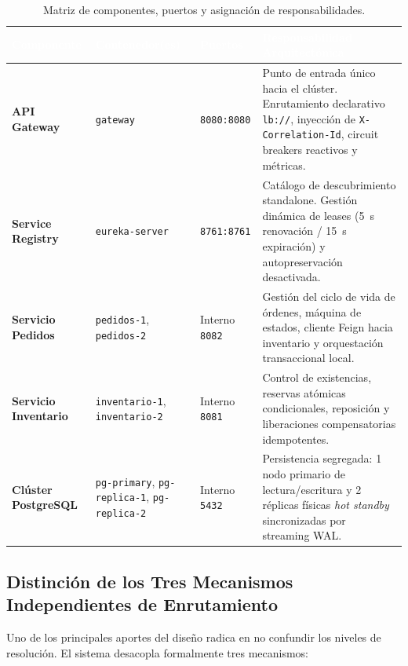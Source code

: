 \documentclass[12pt,a4paper]{article}
\begin{document}
\begin{table}[H]
\centering
\small
\begin{tabularx}{\textwidth}{@{}L{2.8cm}L{3.0cm}L{2.2cm}Y@{}}
\toprule[1.2pt]
\textcolor{white}{\textbf{Componente}} & 
\textcolor{white}{\textbf{Contenedor(es)}} & 
\textcolor{white}{\textbf{Puertos}} & 
\textcolor{white}{\textbf{Responsabilidad Arquitect\'{o}nica}} \\
\midrule[0.8pt]
\textbf{API Gateway} & 
\texttt{gateway} & 
\texttt{8080:8080} & 
Punto de entrada \'{u}nico hacia el cl\'{u}ster. Enrutamiento declarativo \texttt{lb://}, inyecci\'{o}n de \texttt{X-Correlation-Id}, circuit breakers reactivos y m\'{e}tricas. \\
\textbf{Service Registry} & 
\texttt{eureka-server} & 
\texttt{8761:8761} & 
Cat\'{a}logo de descubrimiento standalone. Gesti\'{o}n din\'{a}mica de leases (5~s renovaci\'{o}n / 15~s expiraci\'{o}n) y autopreservaci\'{o}n desactivada. \\
\textbf{Servicio Pedidos} & 
\texttt{pedidos-1}, \texttt{pedidos-2} & 
Interno \texttt{8082} & 
Gesti\'{o}n del ciclo de vida de \'{o}rdenes, m\'{a}quina de estados, cliente Feign hacia inventario y orquestaci\'{o}n transaccional local. \\
\textbf{Servicio Inventario} & 
\texttt{inventario-1}, \texttt{inventario-2} & 
Interno \texttt{8081} & 
Control de existencias, reservas at\'{o}micas condicionales, reposici\'{o}n y liberaciones compensatorias idempotentes. \\
\textbf{Cl\'{u}ster PostgreSQL} & 
\texttt{pg-primary}, \texttt{pg-replica-1}, \texttt{pg-replica-2} & 
Interno \texttt{5432} & 
Persistencia segregada: 1 nodo primario de lectura/escritura y 2 r\'{e}plicas f\'{i}sicas \textit{hot standby} sincronizadas por streaming WAL. \\
\bottomrule[1.2pt]
\end{tabularx}
\caption{Matriz de componentes, puertos y asignaci\'{o}n de responsabilidades.}
\label{tab:componentes}
\end{table}

\subsection{Distinci\'{o}n de los Tres Mecanismos Independientes de Enrutamiento}

Uno de los principales aportes del dise\~{n}o radica en no confundir los niveles de resoluci\'{o}n. El sistema desacopla formalmente tres mecanismos:
\end{document}
